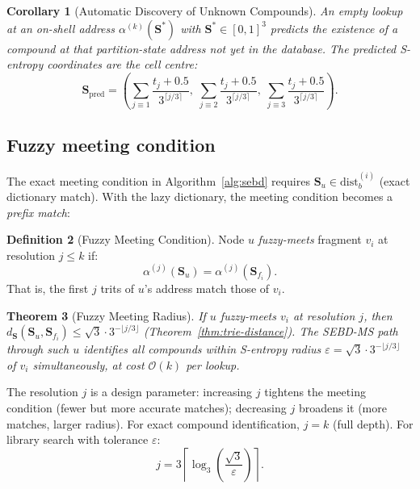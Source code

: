 \documentclass[twocolumn,10pt,a4paper]{article}
\theoremstyle{thmstyle}
\newtheorem{theorem}{Theorem}[section]
\newtheorem{corollary}[theorem]{Corollary}
\theoremstyle{definition}
\newtheorem{definition}[theorem]{Definition}
\theoremstyle{remark}
\newcommand{\Sv}{\mathbf{S}}
\begin{document}
\begin{corollary}[Automatic Discovery of Unknown Compounds]
\label{cor:unknown}
An empty lookup at an on-shell address $\alpha^{(k)}(\Sv^*)$ with
$\Sv^* \in [0,1]^3$ predicts the existence of a compound at that
partition-state address not yet in the database. The predicted
S-entropy coordinates are the cell centre:
\begin{equation}
\Sv_\text{pred} = \left(\sum_{j \equiv 1} \frac{t_j + 0.5}{3^{\lceil j/3\rceil}},\;
\sum_{j \equiv 2} \frac{t_j + 0.5}{3^{\lceil j/3\rceil}},\;
\sum_{j \equiv 3} \frac{t_j + 0.5}{3^{\lceil j/3\rceil}}\right).
\label{eq:cell-centre}
\end{equation}
\end{corollary}

\subsection{Fuzzy meeting condition}

The exact meeting condition in Algorithm~\ref{alg:sebd} requires
$\Sv_u \in \text{dist}_b^{(i)}$ (exact dictionary match). With the
lazy dictionary, the meeting condition becomes a \emph{prefix match}:

\begin{definition}[Fuzzy Meeting Condition]
\label{def:fuzzy-meet}
Node $u$ \emph{fuzzy-meets} fragment $v_i$ at resolution $j \leq k$ if:
\begin{equation}
\alpha^{(j)}(\Sv_u) = \alpha^{(j)}(\Sv_{f_i}).
\label{eq:fuzzy-meet}
\end{equation}
That is, the first $j$ trits of $u$'s address match those of $v_i$.
\end{definition}

\begin{theorem}[Fuzzy Meeting Radius]
\label{thm:fuzzy-radius}
If $u$ fuzzy-meets $v_i$ at resolution $j$, then
$d_{\Sv}(\Sv_u, \Sv_{f_i}) \leq \sqrt{3} \cdot 3^{-\lfloor j/3 \rfloor}$
(Theorem~\ref{thm:trie-distance}). The SEBD-MS path through such
$u$ identifies all compounds within S-entropy radius
$\varepsilon = \sqrt{3} \cdot 3^{-\lfloor j/3\rfloor}$ of $v_i$
simultaneously, at cost $\mathcal{O}(k)$ per lookup.
\end{theorem}

The resolution $j$ is a design parameter: increasing $j$ tightens the
meeting condition (fewer but more accurate matches); decreasing $j$
broadens it (more matches, larger radius). For exact compound
identification, $j = k$ (full depth). For library search
with tolerance $\varepsilon$:
\begin{equation}
j = 3\left\lceil\log_3\!\left(\frac{\sqrt{3}}{\varepsilon}\right)\right\rceil.
\label{eq:j-from-epsilon}
\end{equation}
\end{document}
